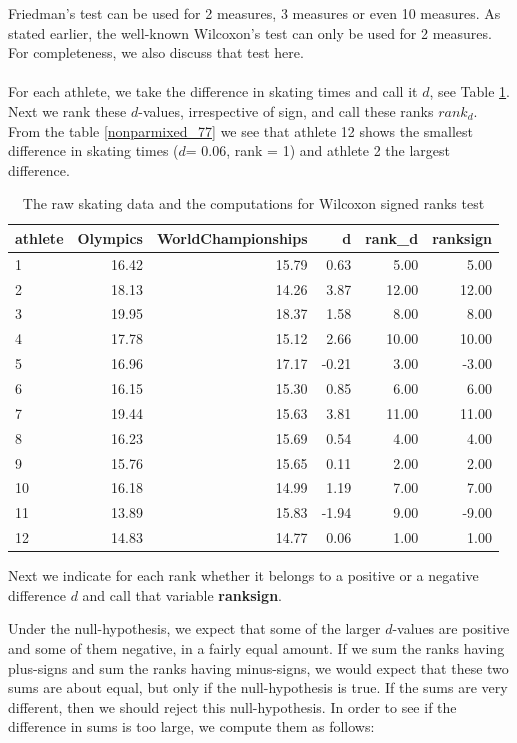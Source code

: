 \documentclass[]{report}\usepackage[]{graphicx}\usepackage[]{color}
\begin{document}
Friedman's test can be used for 2 measures, 3 measures or even 10 measures. As stated earlier, the well-known Wilcoxon's test can only be used for 2 measures. For completeness, we also discuss that test here.
\\
\\
For each athlete, we take the difference in skating times and call it $d$, see Table \ref{tab:nonparmixed_77}. Next we rank these $d$-values, irrespective of sign, and call these ranks $rank_d$. From the table \ref{nonparmixed_77} we see that athlete 12 shows the smallest difference in skating times ($d$= 0.06, rank = 1) and athlete 2 the largest difference.

\begin{table}[ht]
\centering
\caption{The raw skating data and the computations for Wilcoxon signed ranks test} 
\label{tab:nonparmixed_77}
\begin{tabular}{lrrrrr}
  \hline
athlete & Olympics & WorldChampionships & d & rank\_d & ranksign \\ 
  \hline
1 & 16.42 & 15.79 & 0.63 & 5.00 & 5.00 \\ 
  2 & 18.13 & 14.26 & 3.87 & 12.00 & 12.00 \\ 
  3 & 19.95 & 18.37 & 1.58 & 8.00 & 8.00 \\ 
  4 & 17.78 & 15.12 & 2.66 & 10.00 & 10.00 \\ 
  5 & 16.96 & 17.17 & -0.21 & 3.00 & -3.00 \\ 
  6 & 16.15 & 15.30 & 0.85 & 6.00 & 6.00 \\ 
  7 & 19.44 & 15.63 & 3.81 & 11.00 & 11.00 \\ 
  8 & 16.23 & 15.69 & 0.54 & 4.00 & 4.00 \\ 
  9 & 15.76 & 15.65 & 0.11 & 2.00 & 2.00 \\ 
  10 & 16.18 & 14.99 & 1.19 & 7.00 & 7.00 \\ 
  11 & 13.89 & 15.83 & -1.94 & 9.00 & -9.00 \\ 
  12 & 14.83 & 14.77 & 0.06 & 1.00 & 1.00 \\ 
   \hline
\end{tabular}
\end{table}


Next we indicate for each rank whether it belongs to a positive or a negative difference $d$ and call that variable \textbf{ranksign}.

Under the null-hypothesis, we expect that some of the larger $d$-values are positive and some of them negative, in a fairly equal amount. If we sum the ranks having plus-signs and sum the ranks having minus-signs, we would expect that these two sums are about equal, but only if the null-hypothesis is true. If the sums are very different, then we should reject this null-hypothesis. In order to see if the difference in sums is too large, we compute them as follows:
\end{document}

